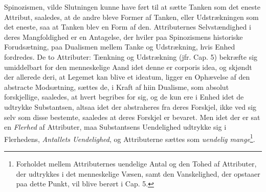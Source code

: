 \documentclass[12pt,a4paper]{book}
\newcommand{\opage}[1]{\marginnote{\footnotesize\textit{[#1]}}}
\begin{document}
Spinozismen, vilde Slutningen kunne have ført til at sætte Tanken som
det eneste Attribut, saaledes, at de andre bleve Former af Tanken,
eller Udstrækningen som det eneste, saa at Tanken blev en Form af den.
Attributernes Selvstændighed i deres Mangfoldighed er en Antagelse, der
hviler paa Spinozismens historiske Forudsætning, paa Dualismen mellem
Tanke og Udstrækning, hvis Enhed fordredes. De to Attributer: Tænkning
og Udstrækning (jfr. Cap. 5) bekræfte sig umiddelbart for den
menneskelige Aand idet denne er corporis idea, og skjøndt der allerede
deri, at Legemet kan blive et ideatum, ligger en Ophævelse af den
abstracte Modsætning, sættes de, i Kraft af hiin Dualisme, som absolut
forskjellige, saaledes, at hvert begribes for sig, og de kun ere i
Enhed idet de udtrykke Substantsen, altsaa idet der abstraheres fra
deres Forskjel, ikke ved sig selv som disse bestemte, saaledes at deres
Forskjel er bevaret. Men idet der er sat en \emph{Flerhed} af
Attributer, maa Substantsens Uendelighed udtrykke
\opage{52} \setcounter{footnote}{0}%
sig i Flerhedens, \emph{Antallets Uendelighed}, og Attributerne sættes
som \emph{uendelig mange}\footnote{Forholdet mellem Attributernes
uendelige Antal og den Tohed af Attributer, der udtrykkes i det
menneskelige Væsen, samt den Vanskelighed, der opstaaer paa dette
Punkt, vil blive berørt i Cap. 5.}.
\end{document}
